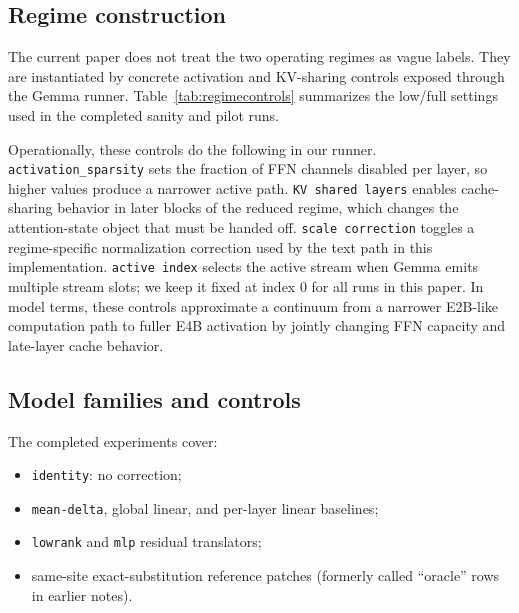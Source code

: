 \documentclass[11pt]{article}
\newcommand{\method}[1]{\texttt{#1}}
\begin{document}
\subsection{Regime construction}
The current paper does not treat the two operating regimes as vague labels. They are instantiated by concrete activation and KV-sharing controls exposed through the Gemma runner. Table~\ref{tab:regimecontrols} summarizes the low/full settings used in the completed sanity and pilot runs.

\begin{table}[H]
    \centering
    \small
    
    \caption{Low/full regime controls used for the current RegimeLift study. These settings define the reduced E2B-like path and the fuller E4B path used throughout the paired-state pipeline.}
    \label{tab:regimecontrols}
\end{table}

Operationally, these controls do the following in our runner. \texttt{activation\_sparsity} sets the fraction of FFN channels disabled per layer, so higher values produce a narrower active path. \texttt{KV shared layers} enables cache-sharing behavior in later blocks of the reduced regime, which changes the attention-state object that must be handed off. \texttt{scale correction} toggles a regime-specific normalization correction used by the text path in this implementation. \texttt{active index} selects the active stream when Gemma emits multiple stream slots; we keep it fixed at index 0 for all runs in this paper. In model terms, these controls approximate a continuum from a narrower E2B-like computation path to fuller E4B activation by jointly changing FFN capacity and late-layer cache behavior.

\subsection{Model families and controls}
The completed experiments cover:
\begin{itemize}[leftmargin=1.4em]
    \item \method{identity}: no correction;
    \item \method{mean-delta}, global linear, and per-layer linear baselines;
    \item \method{lowrank} and \method{mlp} residual translators;
    \item same-site exact-substitution reference patches (formerly called ``oracle'' rows in earlier notes).
\end{itemize}
\end{document}
